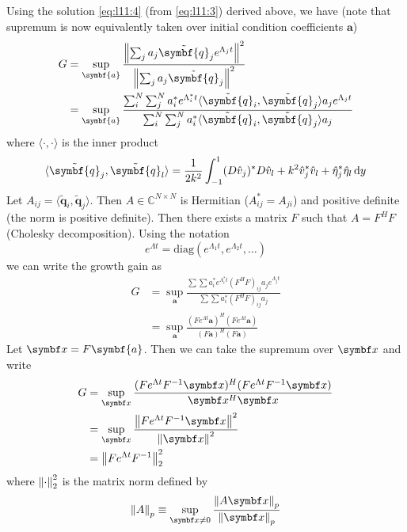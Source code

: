 \documentclass{jknotes}
\begin{document}
Using the solution \eqref{eq:l11:4} (from \eqref{eq:l11:3}) derived above, we
have (note that supremum is now equivalently taken over initial condition
coefficients $\symbf{a}$)
\begin{align}
	G &= \sup_{\symbf{a}} \frac{ \norm{ \sum_j a_j \tilde{\symbf{q}}_j
	e^{\Lambda_j t}}^2 }{ \norm{ \sum_j a_j \tilde{\symbf{q}}_j}^2 } \\
	  &= \sup_{\symbf{a}} \frac{ \sum_i^N \sum_j^N a_i^* e^{\Lambda_i^* t}
		  \langle \tilde{\symbf{q}}_i, \tilde{\symbf{q}}_j \rangle a_j
	  e^{\Lambda_j t}}{ \sum_i^N \sum_j^N a_i^*
  \langle \tilde{\symbf{q}}_i, \tilde{\symbf{q}}_j \rangle a_j} \\
\end{align}
where $\langle\cdot,\cdot\rangle$ is the inner product
\begin{equation}
	\langle \tilde{\symbf{q}}_j, \tilde{\symbf{q}}_l\rangle = \frac{1}{2k^2}
	\int_{-1}^1 (D \hat{v}_j)^* D\hat{v}_l + k^2 \hat{v}_j^* \hat{v}_l +
	\hat{\eta}_j^* \hat{\eta}_l \, \diffd y
\end{equation}
Let $A_{ij} = \langle \tilde{\symbf{q}}_i, \tilde{\symbf{q}}_j\rangle$. Then
$A \in \mathbb{C}^{N \times N}$ is Hermitian ($A_{ij}^* = A_{ji}$) and
positive definite (the norm is positive definite). Then there exists a matrix
$F$ such that $A = F^H F$ (Cholesky decomposition). Using the notation
\begin{equation}
	e^{\Lambda t} = \text{diag}(e^{\Lambda_1 t}, e^{\Lambda_2 t}, \dots )
\end{equation}
we can write the growth gain as
\begin{align}
	G &= \sup_{\symbf{a}} \frac{\sum \sum a_i^* e^{\Lambda_i^* t} (F^H F)_{ij}
	a_j e^{\Lambda_j t}}{\sum \sum a_i^* (F^H F)_{ij} a_j} \\
	  &= \sup_{\symbf{a}} \frac{(F e^{\Lambda t} \symbf{a})^H (Fe^{\Lambda
	  t}\symbf{a})}{(F\symbf{a})^H(F\symbf{a})}
\end{align}
Let $\x = F\symbf{a}$. Then we can take the supremum over $\x$ and write
\begin{align}
	G &= \sup_{\x} \frac{(Fe^{\Lambda t} F^{-1}\x)^H(Fe^{\Lambda
	t}F^{-1}\x)}{\x^H \x} \\
	  &= \sup_{\x} \frac{\norm{Fe^{\Lambda t}F^{-1}\x}^2}{\norm{\x}^2} \\
	  &= \norm{Fe^{\Lambda t}F^{-1}}^2_2
\end{align}
where $\norm{\cdot}^2_2$ is the matrix norm defined by
\begin{equation}
	\norm{A}_p \equiv \sup_{\x \ne 0} \frac{\norm{A \x}_p}{\norm{\x}_p}
\end{equation}
\end{document}

